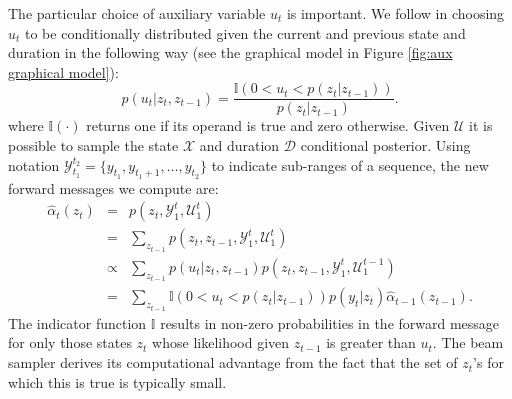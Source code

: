 
The particular choice of auxiliary variable $u_t$ is important.  We follow  \cite{vanGael2008} in choosing $u_t$ to be conditionally distributed given the current and previous state and duration in the following way (see the graphical model in Figure \ref{fig:aux graphical model}):
\begin{equation}
    \label{eqn:slice}
    p(u_t | z_t, z_{t-1}) = 
    \frac
    {\mathbb{I}(0 < u_t < p(z_t | z_{t-1}))} 
    {p(z_t | z_{t-1})}.
\end{equation}
where $\mathbb{I}(\cdot)$ returns one if its operand is true and zero otherwise. Given $\mathcal{U}$ it is possible to sample the state $\mathcal{X}$ and duration $\mathcal{D}$ conditional posterior. 
Using notation $\mathcal{Y}_{t_1}^{t_2} = \{y_{t_1}, y_{t_1+1}, \ldots,y_{t_2}\}$  to indicate sub-ranges of a sequence, the new forward messages we compute are:
\begin{eqnarray}
   \hat{\alpha}_t(z_t) &=& 
   p(z_t, \mathcal{Y}_1^t , \mathcal{U}_1^{t})   \label{eqn:scaled forward} \\
   &=& 
   \sum_{z_{t-1}}
   p(z_t, z_{t-1} , \mathcal{Y}_1^t , \mathcal{U}_1^{t}) \nonumber \\
   &\propto& 
   \sum_{z_{t-1}}
   p(u_{t} | z_t, z_{t-1})
   p(z_t, z_{t-1} , \mathcal{Y}_1^t, \mathcal{U}_1^{t-1}) \nonumber \\
   &=& 
   \sum_{z_{t-1}}
   \mathbb{I}(0 < u_{t} < p(z_t | z_{t-1}))
   p(y_t|z_t) \hat{\alpha}_{t-1}(z_{t-1}) \nonumber.
\end{eqnarray}
The indicator function $\mathbb{I}$ results in non-zero probabilities in the forward message for only those states $z_t$ whose likelihood given $z_{t-1}$ is greater than $u_t$. The beam sampler derives its computational advantage from the fact that the set of $z_t$'s for which this is true is typically small. 
